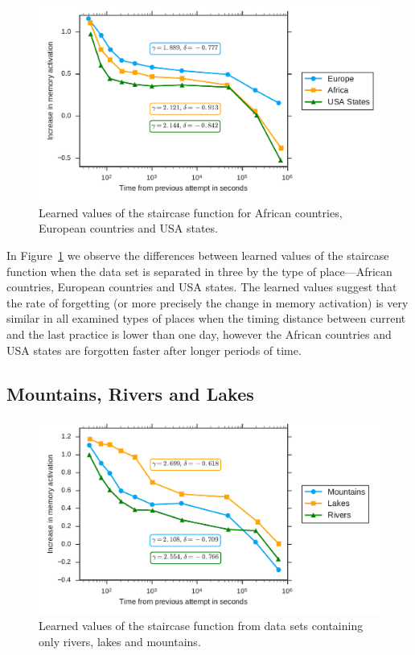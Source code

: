 \begin{figure}[htbp]
  \centering
  \includegraphics[width=\textwidth]{img/africa-europe-usa-states}
  \caption{Learned values of the staircase function for African countries, European countries and USA states.}
  \label{fig:africa-europe-usa-states}
\end{figure}

In Figure~\ref{fig:africa-europe-usa-states} we observe the differences between learned values of the staircase function when the data set is separated in three by the type of place---African countries, European countries and USA states. The learned values suggest that the rate of forgetting (or more precisely the change in memory activation) is very similar in all examined types of places when the timing distance between current and the last practice is lower than one day, however the African countries and USA states are forgotten faster after longer periods of time.

\subsection{Mountains, Rivers and Lakes}

\begin{figure}[htbp]
  \centering
  \includegraphics[width=\textwidth]{img/lakes-rivers-mountains}
  \caption{Learned values of the staircase function from data sets containing only rivers, lakes and mountains.}
  \label{fig:lakes-rivers-mountains}
\end{figure}

